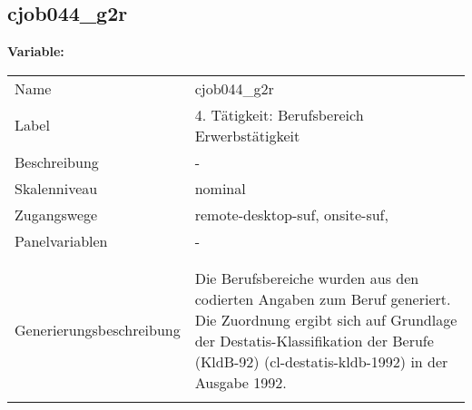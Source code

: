 	
	
	\subsection{cjob044\_g2r}
	\label{subSection:cjob044_g2r}

	\noindent\textbf{Variable:}\\
		\begin{tabular}{lL{11.3cm}}
			\label{tableVariable:cjob044_g2r}
			Name & cjob044\_g2r \\
			Label & 4. Tätigkeit: Berufsbereich Erwerbstätigkeit \\
			Beschreibung & - \\
			Skalenniveau & nominal \\
			Zugangswege &
				remote-desktop-suf,
				onsite-suf,
 \\
			Panelvariablen & -
			 \\
			 \\
 \\
					Generierungsbeschreibung & Die Berufsbereiche wurden aus den codierten Angaben zum Beruf generiert. Die Zuordnung ergibt sich auf Grundlage der Destatis-Klassifikation der Berufe (KldB-92) (cl-destatis-kldb-1992) in der Ausgabe 1992. 
				 \\	
			 \\
		\end{tabular}






